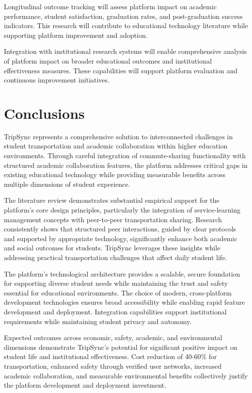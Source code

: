 \documentclass[conference]{IEEEtran}
\begin{document}
Longitudinal outcome tracking will assess platform impact on academic performance, student satisfaction, graduation rates, and post-graduation success indicators. This research will contribute to educational technology literature while supporting platform improvement and adoption.

Integration with institutional research systems will enable comprehensive analysis of platform impact on broader educational outcomes and institutional effectiveness measures. These capabilities will support platform evaluation and continuous improvement initiatives.

\section{Conclusions}

TripSync represents a comprehensive solution to interconnected challenges in student transportation and academic collaboration within higher education environments. Through careful integration of commute-sharing functionality with structured academic collaboration features, the platform addresses critical gaps in existing educational technology while providing measurable benefits across multiple dimensions of student experience.

The literature review demonstrates substantial empirical support for the platform's core design principles, particularly the integration of service-learning management concepts with peer-to-peer transportation sharing. Research consistently shows that structured peer interactions, guided by clear protocols and supported by appropriate technology, significantly enhance both academic and social outcomes for students. TripSync leverages these insights while addressing practical transportation challenges that affect daily student life.

The platform's technological architecture provides a scalable, secure foundation for supporting diverse student needs while maintaining the trust and safety essential for educational environments. The choice of modern, cross-platform development technologies ensures broad accessibility while enabling rapid feature development and deployment. Integration capabilities support institutional requirements while maintaining student privacy and autonomy.

Expected outcomes across economic, safety, academic, and environmental dimensions demonstrate TripSync's potential for significant positive impact on student life and institutional effectiveness. Cost reduction of 40-60\% for transportation, enhanced safety through verified user networks, increased academic collaboration, and measurable environmental benefits collectively justify the platform development and deployment investment.
\end{document}
